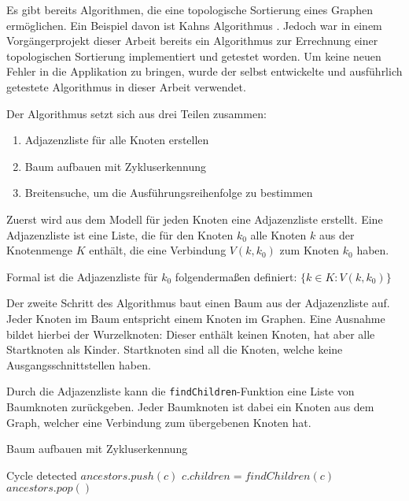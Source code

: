 Es gibt bereits Algorithmen, die eine topologische Sortierung eines Graphen ermöglichen. Ein Beispiel davon ist Kahns Algorithmus \cite{Kahn:1962}. Jedoch war in einem Vorgängerprojekt dieser Arbeit bereits ein Algorithmus zur Errechnung einer topologischen Sortierung implementiert und getestet worden. Um keine neuen Fehler in die Applikation zu bringen, wurde der selbst entwickelte und ausführlich getestete Algorithmus in dieser Arbeit verwendet.

Der Algorithmus setzt sich aus drei Teilen zusammen:
\begin{enumerate}
    \item Adjazenzliste für alle Knoten erstellen
    \item Baum aufbauen mit Zykluserkennung
    \item Breitensuche, um die Ausführungsreihenfolge zu bestimmen 
\end{enumerate}

Zuerst wird aus dem Modell für jeden Knoten eine Adjazenzliste erstellt. Eine Adjazenzliste ist eine Liste, die für den Knoten $k_0$ alle Knoten $k$ aus der Knotenmenge $K$ enthält, die eine Verbindung $V(k, k_0)$ zum Knoten $k_0$ haben.

Formal ist die Adjazenzliste für $k_0$ folgendermaßen definiert: $\{ k \in K : V(k, k_0) \}$

Der zweite Schritt des Algorithmus baut einen Baum aus der Adjazenzliste auf. Jeder Knoten im Baum entspricht einem Knoten im Graphen. Eine Ausnahme bildet hierbei der Wurzelknoten: Dieser enthält keinen Knoten, hat aber alle Startknoten als Kinder. Startknoten sind all die Knoten, welche keine Ausgangsschnittstellen haben.

Durch die Adjazenzliste kann die \texttt{findChildren}-Funktion eine Liste von Baumknoten zurückgeben. Jeder Baumknoten ist dabei ein Knoten aus dem Graph, welcher eine Verbindung zum übergebenen Knoten hat.

\begin{algorithm}[H]
    \caption{Baum aufbauen mit Zykluserkennung}
    \label{alg:createtree}
    \begin{algorithmic}[1]
                    \State Cycle detected
                \EndIf
                \State $ancestors.push(c)$
                \State $c.children = findChildren(c)$
                \State {}
                \State $ancestors.pop()$
            \EndFor
        \EndFunction
    \end{algorithmic}
\end{algorithm}

